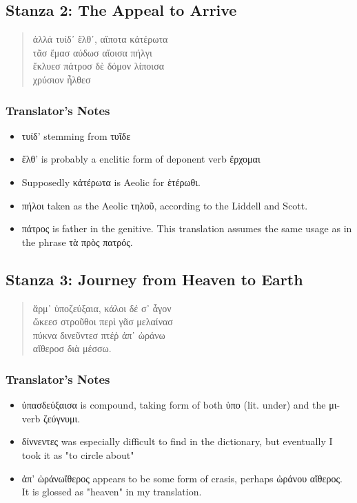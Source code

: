 \subsection*{Stanza 2: The Appeal to Arrive}
\begin{quote}
  ἀλλά τυίδ᾽ ἔλθ᾽, αἴποτα κἀτέρωτα\\
  τᾶσ ἔμασ αύδωσ αἴοισα πήλγι\\
  ἔκλυεσ πάτροσ δὲ δόμον λίποισα\\
  χρύσιον ἦλθεσ
\end{quote}

\subsubsection*{Translator's Notes}
\begin{itemize}
  \item τυίδ' stemming from τυῖδε
  \item ἔλθ' is probably a enclitic form of deponent verb ἔρχομαι
  \item Supposedly κἀτέρωτα is Aeolic for ἑτέρωθι.
  \item πήλοι taken as the Aeolic τηλοῦ, according to the Liddell and Scott.
  \item πάτρος is father in the genitive. This translation assumes the same usage as in the phrase τὰ πρὸς πατρός.
\end{itemize}

\subsection*{Stanza 3: Journey from Heaven to Earth}
\begin{quote}
  ἄρμ᾽ ὐποζεύξαια, κάλοι δέ σ᾽ ἆγον\\
  ὤκεεσ στροῦθοι περὶ γᾶσ μελαίνασ\\
  πύκνα δινεῦντεσ πτέῤ ἀπ᾽ ὠράνω\\
  αἴθεροσ διὰ μέσσω.
\end{quote}

\subsubsection*{Translator's Notes}
\begin{itemize}
  \item ὐπασδεύξαισα is compound, taking form of both ὑπο (lit. under) and the μι-verb ζεύγνυμι.
  \item δίννεντες was especially difficult to find in the dictionary, but eventually I took it as "to circle about"
  \item ἀπ' ὠράνωἴθερος appears to be some form of crasis, perhaps ὠράνου αἴθερος. It is glossed as "heaven" in my translation.
\end{itemize}

